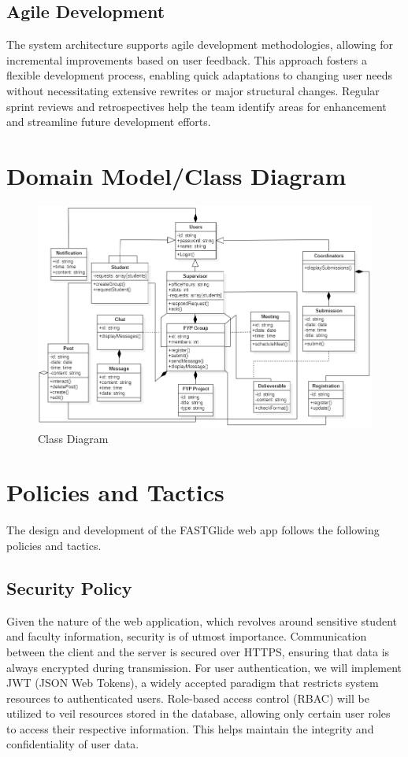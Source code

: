 \documentclass{FastFyp}
\begin{document}
\subsection{Agile Development}
The system architecture supports agile development methodologies, allowing for incremental improvements based on user feedback.
This approach fosters a flexible development process, enabling quick adaptations to changing user needs without necessitating extensive rewrites or major structural changes.
Regular sprint reviews and retrospectives help the team identify areas for enhancement and streamline future development efforts.



\section{Domain Model/Class Diagram}
\begin{figure}[!h]
    \centering
    \includegraphics[width=\textwidth]{Figures/updatedClass}
    \caption{Class Diagram}
\end{figure}

\section{Policies and Tactics}
The design and development of the FASTGlide web app follows the following policies and tactics.

\subsection{Security Policy}
Given the nature of the web application, which revolves around sensitive student and faculty information, security is of utmost importance.
Communication between the client and the server is secured over HTTPS, ensuring that data is always encrypted during transmission.
For user authentication, we will implement JWT (JSON Web Tokens), a widely accepted paradigm that restricts system resources to authenticated users.
Role-based access control (RBAC) will be utilized to veil resources stored in the database, allowing only certain user roles to access their respective information. This helps maintain the integrity and confidentiality of user data.
\end{document}
